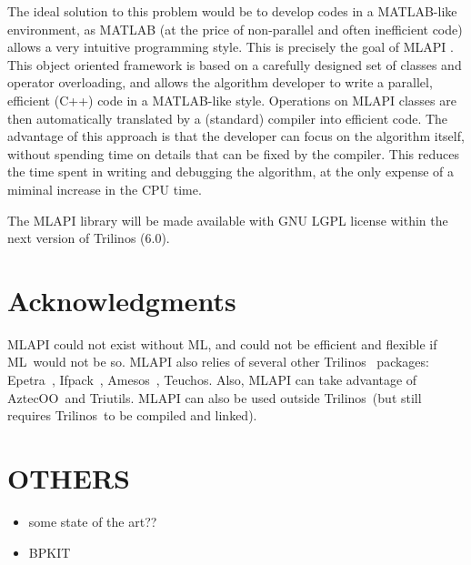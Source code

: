 \documentclass{article}[11pt]
\newcommand{\Aztecoo}  {{\sc AztecOO}}
\newcommand{\aztecoo}  {{\Aztecoo}}
\newcommand{\epetra}  {{\sc Epetra}}
\newcommand{\ML}     {{\sc ML}}
\newcommand{\trilinos}  {{\sc Trilinos}}
\newcommand{\amesos}  {{\sc Amesos}}
\newcommand{\triutils}  {{\sc Triutils}}
\newcommand{\ifpack}  {{\sc Ifpack}}
\newcommand{\teuchos}  {{\sc Teuchos}}
\newcommand{\MLAPI}  {{\sc MLAPI }}
\begin{document}
The ideal solution to this problem would be to develop codes in a MATLAB-like
environment, as MATLAB (at the price of non-parallel and often inefficient
code) allows a very intuitive programming style. This
is precisely the goal of \MLAPI. This object oriented framework is based on a
carefully designed set of classes and operator overloading, and allows the
algorithm developer to write a parallel, efficient (C++) code in a MATLAB-like
style. Operations on \MLAPI classes are then automatically translated by a
(standard) compiler into efficient code.  The advantage of this approach is
that the developer can focus on the algorithm itself, without spending time on
details that can be fixed by the compiler. This reduces the time spent in
writing and debugging the algorithm, at the only expense of a miminal increase
in the CPU time.

\smallskip

The \MLAPI library will be made available with GNU LGPL license within the
next version of Trilinos (6.0).

\section{Acknowledgments}
\label{sec:acks}

\MLAPI could not exist without \ML, and could not be efficient and flexible if 
\ML\ would not be so. \MLAPI also relies of several other
\trilinos~\cite{Trilinos-home-page} packages:
\epetra~\cite{epetra-guide}, \ifpack~\cite{ifpack-guide}, 
\amesos~\cite{amesos-guide}, \teuchos. Also, \MLAPI can take advantage of
\aztecoo\ and \triutils. \MLAPI can also be used outside
\trilinos\ (but still requires \trilinos\ to be compiled and linked). 

\section{OTHERS}

\begin{itemize}
\item some state of the art??

\item BPKIT
\end{itemize}


\end{document}
